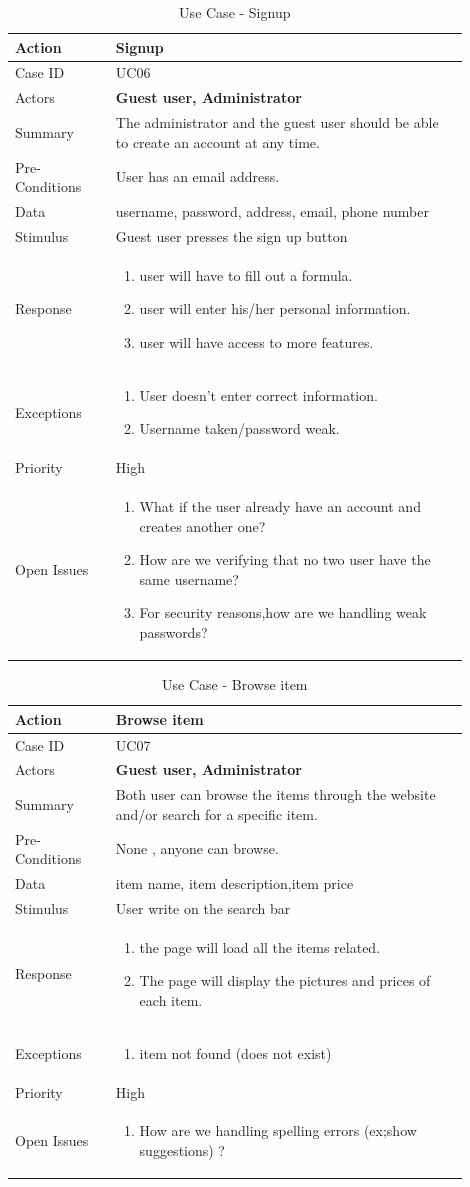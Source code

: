 \documentclass[11pt]{article}
\newcounter{use case ID}
\newcommand\tabularhead[1]{
    \begin{table}[ht]
        \addtocounter{use case ID}{1}
        \caption{Use Case \arabic{use case ID} - #1}
        \vspace{0.2cm}
        \begin{tabular}{|p{0.2\linewidth}|p{0.70\linewidth}|}
            \hline
            \textbf{Action} & \textbf{#1} \\
            \hline}
\newcommand\addrow[2]{#1 & #2\\ \hline}
\newcommand\addmulrow[2]{ \begin{minipage}[t][][t]{2.5cm}#1\end{minipage}
                &\begin{minipage}[t][][t]{11cm}
                    \begin{enumerate}[itemsep=-1ex] #2   \end{enumerate}
                \end{minipage}\vfill\\ \hline}
\newenvironment{usecase}{\tabularhead}
        {\hline\end{tabular}\end{table}}
\begin{document}
\begin{usecase}{Signup}
    \addrow{Case ID}{UC06}
    \addrow{Actors}{\textbf{Guest user, Administrator}}
    \addrow{Summary}{The \index{administrator}administrator and the \index{guest user}guest user should be able to create an account at any time.}
    \addrow{Pre-Conditions}{
       User has an email address.
        }
    \addrow{\index{data}Data}{
username, password, address, email, phone number
}
    \addrow{Stimulus}{\index{guest user}Guest user presses the sign up button}
    \addmulrow{Response}{
        \item user will have to fill out a formula.
        \item user will enter his/her personal \index{information}information.
        \item user will have access to more features.
    }
    \addmulrow{Exceptions}{
        \item User doesn't enter correct \index{information}information.
        \item Username taken/password weak.
    }
    \addrow{Priority}{High}
    \addmulrow{Open Issues}{
        \item What if the user already have an account and creates another one?
        \item How are we verifying that no two user have the same username?
        \item For security reasons,how are we handling weak passwords?
    }
\end{usecase}

\begin{usecase}{Browse item}
    \addrow{Case ID}{UC07}
    \addrow{Actors}{\textbf{Guest user, Administrator}}
    \addrow{Summary}{Both user can browse the items through the website and/or search for a specific item.}
    \addrow{Pre-Conditions}{
       None , anyone can browse.
        }
    \addrow{\index{data}Data}{
    item name, item description,item price}
    \addrow{Stimulus}{User write on the search bar}
    \addmulrow{Response}{
        \item the page will load all the items related.
        \item The page will display the pictures and prices of each item.
    }
    \addmulrow{Exceptions}{
        \item item not found (does not exist)
    }
    \addrow{Priority}{High}
    \addmulrow{Open Issues}{
        \item How are we handling spelling errors (ex;show suggestions) ?
    }
\end{usecase}
\end{document}
